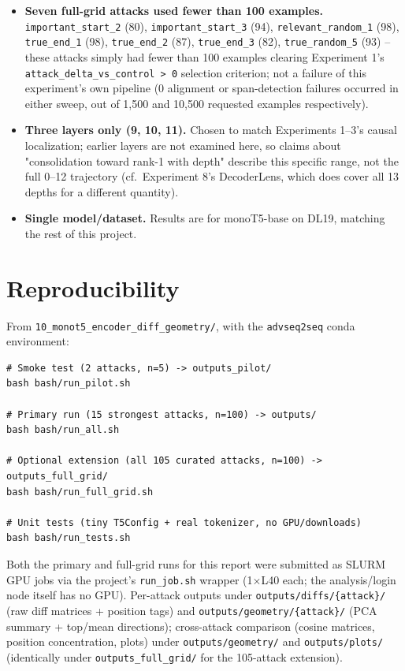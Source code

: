 \documentclass[11pt]{article}
\begin{document}
\begin{itemize}
  8 (DecoderLens) covers.
  \item \textbf{Seven full-grid attacks used fewer than 100 examples.}
  \texttt{important\_start\_2} (80), \texttt{important\_start\_3} (94),
  \texttt{relevant\_random\_1} (98), \texttt{true\_end\_1} (98),
  \texttt{true\_end\_2} (87), \texttt{true\_end\_3} (82),
  \texttt{true\_random\_5} (93) -- these attacks simply had fewer than 100
  examples clearing Experiment 1's \texttt{attack\_delta\_vs\_control >
  0} selection criterion; not a failure of this experiment's own
  pipeline (0 alignment or span-detection failures occurred in either
  sweep, out of 1,500 and 10,500 requested examples respectively).
  \item \textbf{Three layers only (9, 10, 11).} Chosen to match Experiments
  1--3's causal localization; earlier layers are not examined here, so
  claims about "consolidation toward rank-1 with depth" describe this
  specific range, not the full 0--12 trajectory (cf.\ Experiment 8's
  DecoderLens, which does cover all 13 depths for a different quantity).
  \item \textbf{Single model/dataset.} Results are for monoT5-base on
  DL19, matching the rest of this project.
\end{itemize}

\section{Reproducibility}

From \texttt{10\_monot5\_encoder\_diff\_geometry/}, with the
\texttt{advseq2seq} conda environment:

\begin{lstlisting}
# Smoke test (2 attacks, n=5) -> outputs_pilot/
bash bash/run_pilot.sh

# Primary run (15 strongest attacks, n=100) -> outputs/
bash bash/run_all.sh

# Optional extension (all 105 curated attacks, n=100) -> outputs_full_grid/
bash bash/run_full_grid.sh

# Unit tests (tiny T5Config + real tokenizer, no GPU/downloads)
bash bash/run_tests.sh
\end{lstlisting}

\noindent Both the primary and full-grid runs for this report were
submitted as SLURM GPU jobs via the project's \texttt{run\_job.sh} wrapper
(1$\times$L40 each; the analysis/login node itself has no GPU). Per-attack
outputs under \texttt{outputs/diffs/\{attack\}/} (raw diff matrices +
position tags) and \texttt{outputs/geometry/\{attack\}/} (PCA summary +
top/mean directions); cross-attack comparison (cosine matrices, position
concentration, plots) under \texttt{outputs/geometry/} and
\texttt{outputs/plots/} (identically under \texttt{outputs\_full\_grid/}
for the 105-attack extension).
\end{document}
